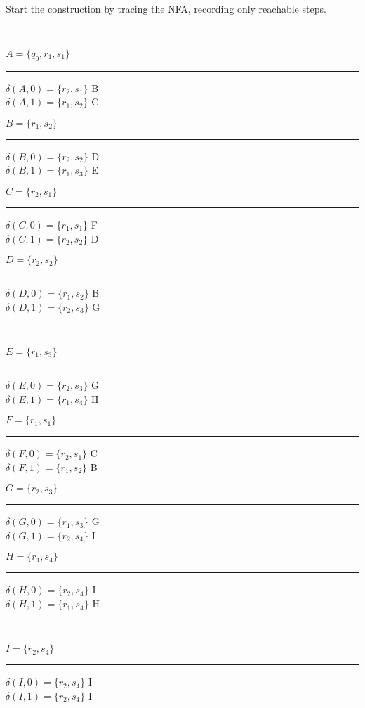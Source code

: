 \begin{problem}{5}\ \\
  Start the construction by tracing the NFA, recording only reachable steps.

  \noindent
  \ \\
  \begin{minipage}[b]{0.25\linewidth}
    $A = \{ q_0, r_1, s_1 \}$
    \hrule
    $\delta(A,0) = \{ r_2, s_1 \} $ B \\
    $\delta(A,1) = \{ r_1, s_2 \} $ C
  \end{minipage}
  \begin{minipage}[b]{0.25\linewidth}
    $B = \{ r_1, s_2 \}$
    \hrule
    $\delta(B,0) = \{ r_2, s_2 \}$ D \\
    $\delta(B,1) = \{ r_1, s_3 \}$ E
  \end{minipage}
  \begin{minipage}[b]{0.25\linewidth}
    $C = \{ r_2, s_1 \}$
    \hrule
    $\delta(C,0) = \{ r_1, s_1 \}$ F \\
    $\delta(C,1) = \{ r_2, s_2 \}$ D
  \end{minipage}
  \begin{minipage}[b]{0.25\linewidth}
    $D = \{ r_2, s_2 \}$
    \hrule
    $\delta(D,0) = \{ r_1, s_2 \}$ B \\
    $\delta(D,1) = \{ r_2, s_3 \}$ G
  \end{minipage}
  \ \\
  \begin{minipage}[b]{0.25\linewidth}
    $E = \{ r_1, s_3 \}$
    \hrule
    $\delta(E,0) = \{ r_2, s_3 \}$ G \\
    $\delta(E,1) = \{ r_1, s_4 \}$ H
  \end{minipage}
  \begin{minipage}[b]{0.25\linewidth}
    $F = \{ r_1, s_1 \}$
    \hrule
    $\delta(F,0) = \{ r_2, s_1 \}$ C \\
    $\delta(F,1) = \{ r_1, s_2 \}$ B
  \end{minipage}
  \begin{minipage}[b]{0.25\linewidth}
    $G = \{ r_2, s_3 \}$
    \hrule
    $\delta(G,0) = \{ r_1, s_3 \}$ G \\
    $\delta(G,1) = \{ r_2, s_4 \}$ I
  \end{minipage}
  \begin{minipage}[b]{0.25\linewidth}
    $H = \{ r_1, s_4 \}$
    \hrule
    $\delta(H,0) = \{ r_2, s_4 \}$ I \\
    $\delta(H,1) = \{ r_1, s_4 \}$ H
  \end{minipage}
  \ \\
  \begin{minipage}[b]{0.25\linewidth}
    $I = \{ r_2, s_4 \}$
    \hrule
    $\delta(I,0) = \{ r_2, s_4 \}$ I \\
    $\delta(I,1) = \{ r_2, s_4 \}$ I
  \end{minipage}


\end{problem}
